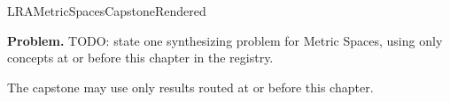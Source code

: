 \ifcsname LRAMetricSpacesCapstoneRendered\endcsname
\else
\expandafter\gdef\csname LRAMetricSpacesCapstoneRendered\endcsname{}

\newpage
{}
\label{cap:metric-spaces}

\begin{tcolorbox}[
  colback=gray!6,
  colframe=gray!40,
  arc=2pt,
  left=8pt, right=8pt, top=6pt, bottom=6pt,
  title={\small\textbf{Capstone Problem}},
  fonttitle=\small\bfseries
]
\textbf{Problem.}
TODO: state one synthesizing problem for Metric Spaces, using only concepts at or
before this chapter in the registry.
\end{tcolorbox}

\begin{remark*}
The capstone may use only results routed at or before this chapter.
\end{remark*}

\clearpage
\fi
